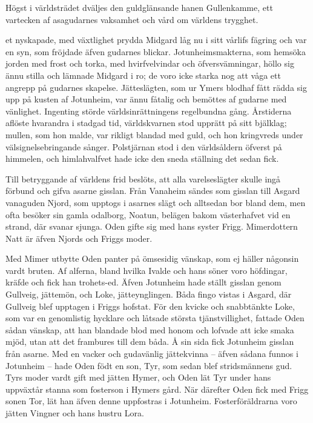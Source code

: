 Högst i världsträdet dväljes den guldglänsande hanen Gullenkamme, ett
vartecken af asagudarnes vaksamhet och vård om världens trygghet.

\endSecII



\dropcapD et nyskapade, med växtlighet prydda Midgard låg nu i sitt vårlifs
fägring och var en syn, som fröjdade äfven gudarnes blickar.
Jotunheimsmakterna, som hemsöka jorden med frost och torka, med
hvirfvelvindar och öfversvämningar, höllo sig ännu stilla och lämnade
Midgard i ro; de voro icke starka nog att våga ett angrepp på gudarnes
skapelse. Jätteslägten, som ur Ymers blodhaf fått rädda sig upp på
kusten af Jotunheim, var ännu fåtalig och bemöttes af gudarne med
vänlighet. Ingenting störde världsinrättningens regelbundna gång.
Årstiderna aflöste hvarandra i stadgad tid, världskvarnen stod upprätt
på sitt bjälklag; mullen, som hon malde, var rikligt blandad med guld,
och hon kringvreds under välsignelsebringande sånger. Polstjärnan stod i
den världsåldern öfverst på himmelen, och himlahvalfvet hade icke den
sneda ställning det sedan fick.

Till betryggande af världens frid beslöts, att alla varelseslägter
skulle ingå förbund och gifva asarne gisslan. Från Vanaheim sändes som
gisslan till Asgard vanaguden Njord, som upptogs i asarnes slägt och
alltsedan bor bland dem, men ofta besöker sin gamla odalborg, Noatun,
belägen bakom västerhafvet vid en strand, där svanar sjunga. Oden gifte
sig med hans syster Frigg. Mimerdottern Natt är äfven Njords och Friggs
moder.

Med Mimer utbytte Oden panter på ömsesidig vänskap, som ej häller
någonsin vardt bruten. Af alferna, bland hvilka Ivalde och hans söner
voro höfdingar, kräfde och fick han trohets-ed. Äfven Jotunheim hade
ställt gisslan genom Gullveig, jättemön, och Loke, jätteynglingen. Båda
fingo vistas i Asgard, där Gullveig blef upptagen i Friggs hofstat. För
den kvicke och snabbtänkte Loke, som var en genomlistig hycklare och
låtsade största tjänstvillighet, fattade Oden sådan vänskap, att han
blandade blod med honom och lofvade att icke smaka mjöd, utan att det
frambures till dem båda. Å sin sida fick Jotunheim gisslan från asarne.
Med en vacker och gudavänlig jättekvinna -- äfven sådana funnos i
Jotunheim -- hade Oden födt en son, Tyr, som sedan blef stridsmännens
gud. Tyrs moder vardt gift med jätten Hymer, och Oden lät Tyr under hans
uppväxtår stanna som fosterson i Hymers gård. När därefter Oden fick med
Frigg sonen Tor, lät han äfven denne uppfostras i Jotunheim.
Fosterföräldrarna voro jätten Vingner och hans hustru Lora.

